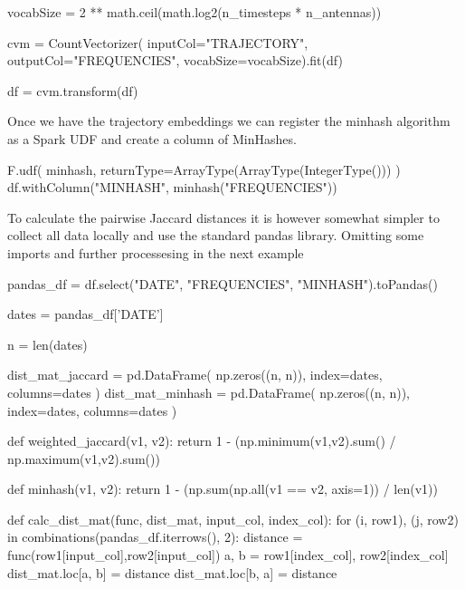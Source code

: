 \documentclass[../main.tex]{subfiles}
\begin{document}
\begin{python}
vocabSize = 2 ** math.ceil(math.log2(n_timesteps * n_antennas))

cvm = CountVectorizer(
        inputCol="TRAJECTORY",
        outputCol="FREQUENCIES",
        vocabSize=vocabSize).fit(df)
        
df = cvm.transform(df)
\end{python}

Once we have the trajectory embeddings we can register the minhash algorithm as a Spark UDF and create a column of MinHashes.

\begin{python}
    F.udf(
        minhash,
        returnType=ArrayType(ArrayType(IntegerType()))
    )
    df.withColumn("MINHASH", minhash("FREQUENCIES"))
\end{python}

To calculate the pairwise Jaccard distances it is however somewhat simpler to collect all data locally and use the standard pandas library. Omitting some imports and further processesing in the next example

\begin{python}
pandas_df = df.select("DATE", "FREQUENCIES", "MINHASH").toPandas()

dates = pandas_df['DATE']

n = len(dates)

dist_mat_jaccard = pd.DataFrame(
                        np.zeros((n, n)),
                        index=dates,
                        columns=dates
                    )
dist_mat_minhash = pd.DataFrame(
                        np.zeros((n, n)),
                        index=dates,
                        columns=dates
                    )

def weighted_jaccard(v1, v2):
    return 1 - (np.minimum(v1,v2).sum() / np.maximum(v1,v2).sum())

def minhash(v1, v2):
    return 1 - (np.sum(np.all(v1 == v2, axis=1)) / len(v1))

def calc_dist_mat(func, dist_mat, input_col, index_col):
    for (i, row1), (j, row2) in combinations(pandas_df.iterrows(), 2):
        distance = func(row1[input_col],row2[input_col])
        a, b = row1[index_col], row2[index_col]
        dist_mat.loc[a, b] = distance
        dist_mat.loc[b, a] = distance
\end{python}



\newpage
\end{document}
